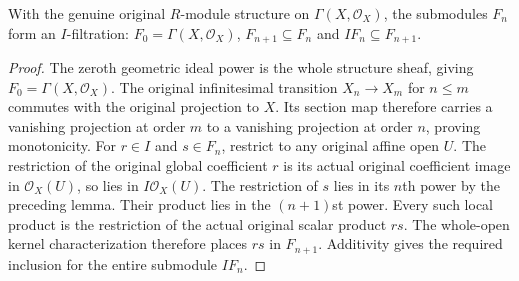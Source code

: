\begin{lemma}
\label{lem:fibre-infinitesimal-global-image-filtration}
\leanok
With the genuine original $R$-module structure on
$\Gamma(X,\mathcal O_X)$, the submodules $F_n$ form an $I$-filtration:
$F_0=\Gamma(X,\mathcal O_X)$, $F_{n+1}\subseteq F_n$ and
$I F_n\subseteq F_{n+1}$.
\end{lemma}
\begin{proof}
The zeroth geometric ideal power is the whole structure sheaf, giving
$F_0=\Gamma(X,\mathcal O_X)$. The original infinitesimal transition
$X_n\to X_m$ for $n\le m$ commutes with the original projection to $X$.
Its section map therefore carries a vanishing projection at order $m$
to a vanishing projection at order $n$, proving monotonicity.
For $r\in I$ and $s\in F_n$, restrict to any original affine open $U$.
The restriction of the original global coefficient $r$ is its actual
original coefficient image in $\mathcal O_X(U)$, so lies in
$I\mathcal O_X(U)$. The restriction of $s$ lies in its $n$th power by
the preceding lemma. Their product lies in the $(n+1)$st power.
Every such local product is the restriction of the actual original
scalar product $rs$. The whole-open kernel characterization therefore
places $rs$ in $F_{n+1}$. Additivity gives the required inclusion for
the entire submodule $I F_n$.
\end{proof}

